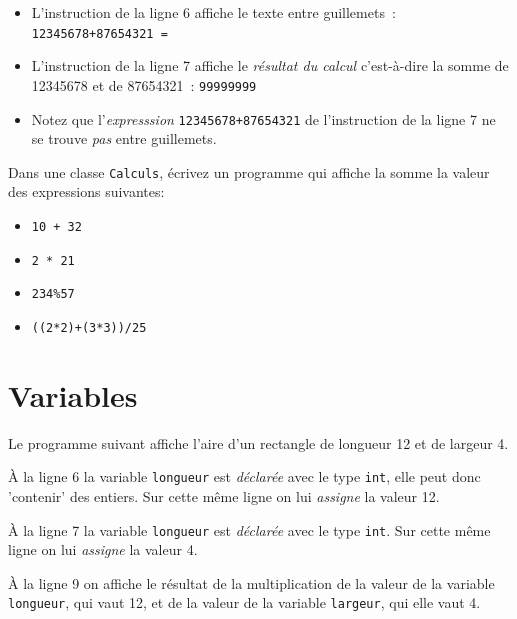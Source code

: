 \documentclass[a4paper,11pt]{article}
\begin{document}

	\begin{itemize}
		\item	L'instruction de la ligne 6 affiche le texte entre guillemets~: \texttt{12345678+87654321 = }
	
		\item L'instruction de la ligne 7 affiche le \emph{résultat du calcul} 
			c'est-à-dire la somme de 12345678 et de 87654321~:  \texttt{99999999}
	
		\item Notez que l'\emph{expresssion} \texttt{12345678+87654321} 
			de l'instruction de la ligne 7 ne se trouve \emph{pas} entre guillemets.
	\end{itemize}


	\begin{Exercice}{}
		Dans une classe \texttt{Calculs}, écrivez un programme qui affiche la somme la valeur des expressions
		suivantes:
		\begin{itemize}
			\item	 \texttt{10 + 32}
			\item  \texttt{2 * 21}
			\item  \texttt{234\%57}
			\item  \texttt{((2*2)+(3*3))/25}
		\end{itemize}
	\end{Exercice}
	

\section{Variables}

	Le programme suivant affiche l'aire d'un rectangle de longueur 12 et de largeur 4.
	

	\`A la ligne 6 la variable \texttt{longueur} est \emph{déclarée} avec le type \texttt{int}, 
	elle peut donc 'contenir' des entiers. 
	Sur cette même ligne on lui \emph{assigne} la valeur 12.  

	\`A la ligne 7 la variable \texttt{longueur} est \emph{déclarée} avec le type \texttt{int}. 
	Sur cette même ligne on lui \emph{assigne} la valeur 4.
	
	\`A la ligne 9 on affiche le résultat de la multiplication de la valeur de la variable \texttt{longueur}, 
	qui vaut 12, et de la valeur de la variable \texttt{largeur}, qui elle vaut 4.  
  
\end{document}
